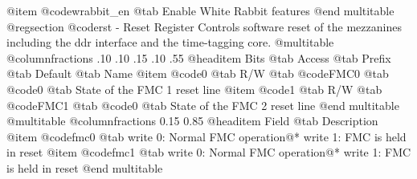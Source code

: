 @item @code{wrabbit_en} @tab Enable White Rabbit features
@end multitable
@regsection @code{rst} - Reset Register
Controls software reset of the mezzanines including the ddr interface and the time-tagging core.
@multitable @columnfractions .10 .10 .15 .10 .55
@headitem Bits @tab Access @tab Prefix @tab Default @tab Name
@item @code{0}
@tab R/W @tab
@code{FMC0}
@tab @code{0} @tab 
State of the FMC 1 reset line
@item @code{1}
@tab R/W @tab
@code{FMC1}
@tab @code{0} @tab 
State of the FMC 2 reset line
@end multitable
@multitable @columnfractions 0.15 0.85
@headitem Field @tab Description
@item @code{fmc0} @tab write 0: Normal FMC operation@* 		 write 1: FMC is held in reset
@item @code{fmc1} @tab write 0: Normal FMC operation@* 		 write 1: FMC is held in reset
@end multitable
